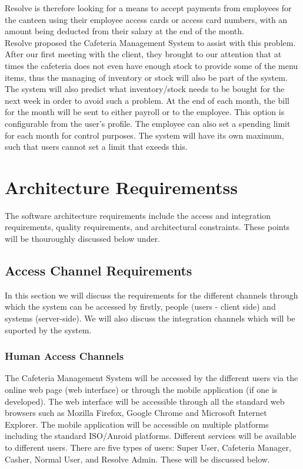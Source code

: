 \documentclass[12pt]{article}
\begin{document}
Resolve is therefore looking for a means to accept payments from employees for the canteen using their employee access cards or access card numbers, with an amount being deducted from their salary at the end of the month.\\

Resolve proposed the Cafeteria Management System to assist with this problem.
After our first meeting with the client, they brought to our attention that at times the cafeteria does not even have enough stock to provide some of the menu items, thus the managing of inventory or stock will also be part of the system. The system will also predict what inventory/stock needs to be bought for the next week in order to avoid such a problem. At the end of each month, the bill for the month will be sent to either payroll or to the employee. This option is configurable from the user's profile. The employee can also set a spending limit for each month for control purposes. The system will have its own maximum, such that users cannot set a limit that exeeds this. 

\section{Architecture Requirementss}
The software architecture requirements include the access and integration requirements, quality
requirements, and architectural constraints. These points will be thouroughly discussed below under.

\subsection{Access Channel Requirements}
In this section we will discuss the requirements for the different channels through which the system can be accessed by firstly, people (users - client side) and systems (server-side). We will also discuss the integration channels which will be suported by the system.


\subsubsection{Human Access Channels}
The Cafeteria Management System will be accessed by the different users via the online web page (web interface) or through the mobile application (if one is developed). The web interface will be accessible through all the standard web browsers such as Mozilla Firefox, Google Chrome and Microsoft Internet Explorer. The mobile application will be accessible on multiple platforms including the standard ISO/Anroid platforms. Different services will be available to different users. There are five types of users: Super User, Cafeteria Manager, Casher, Normal User, and Resolve Admin. These will be discussed below. \\
\end{document}
